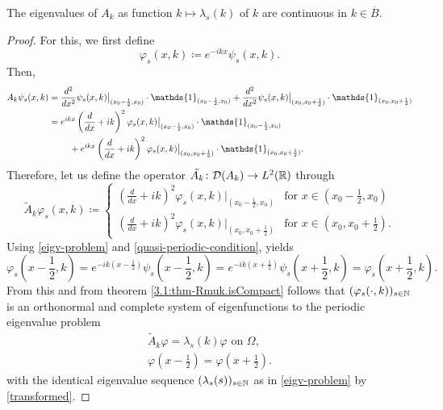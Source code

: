 \begin{theorem}
	The eigenvalues of $A_{k}$ as function $k \mapsto \lambda_{s}(k)$ of $k$ are continuous in $k \in \overline{B}$.

	\begin{proof}
		For this, we first define
			\[ \varphi_{s}(x, k) \coloneqq e^{-ikx} \psi_{s}(x, k). \]
		Then,
		\begin{align}
			A_{k} \psi_{s}(x, k) & = \frac{d^{2}}{dx^{2}} \psi_{s}(x, k)\big|_{(x_{0} - \frac{1}{2}, x_{0})} \cdot \mathds{1}_{(x_{0} - \frac{1}{2}, x_{0})} + \frac{d^{2}}{dx^{2}} \psi_{s}(x, k)\big|_{(x_{0}, x_{0}  + \frac{1}{2})} \cdot \mathds{1}_{(x_{0}, x_{0} + \frac{1}{2})} \notag \\
				& = e^{ikx} \left( \frac{d}{dx} + ik \right)^{2} \varphi_{s}(x, k)\big|_{(x_{0} - \frac{1}{2}, x_{0})} \cdot \mathds{1}_{(x_{0} - \frac{1}{2}, x_{0})} \notag \\
				& ~\qquad + e^{ikx} \left( \frac{d}{dx} + ik \right)^{2} \varphi_{s}(x, k)\big|_{(x_{0}, x_{0}  + \frac{1}{2})} \cdot \mathds{1}_{(x_{0}, x_{0} + \frac{1}{2})}. \label{transformed}
		\end{align}
		Therefore, let us define the operator $\tilde{A_{k}} \colon \mathcal{D}(A_{k}) \rightarrow L^{2}(\mathbb{R})$ through 
			\[ \tilde{A}_{k} \varphi_{s}(x, k) \coloneqq \begin{cases}
 				\left( \frac{d}{dx} + ik \right)^{2} \varphi_{s}(x, k)|_{(x_{0} - \frac{1}{2}, x_{0})} & \text{for } x \in (x_{0} - \frac{1}{2}, x_{0}) \\ \left( \frac{d}{dx} + ik \right)^{2} \varphi_{s}(x, k)|_{(x_{0}, x_{0}  + \frac{1}{2})} & \text{for } x \in (x_{0}, x_{0} + \frac{1}{2}).
 			\end{cases} \] 
		Using \eqref{eigv-problem} and \eqref{quasi-periodic-condition}, yields
			\[ \varphi_{s}\left(x - \frac{1}{2}, k\right) = e^{-ik(x - \frac{1}{2})} \psi_{s}\left(x - \frac{1}{2}, k\right) = e^{-ik(x + \frac{1}{2})} \psi_{s}\left(x + \frac{1}{2}, k\right) = \varphi_{s}\left(x + \frac{1}{2}, k\right). \]
		From this and from theorem \ref{3.1:thm-Rmuk.isCompact} follows that $(\varphi_{s}(\cdot, k))_{s \in \mathbb{N}}$ is an orthonormal and complete system of eigenfunctions to the periodic eigenvalue problem
		\begin{align}
			\tilde{A}_{k} \varphi = \lambda_{s}(k) \varphi \text{ on } \Omega, \label{mod-eigv-problem} \\
		 	\varphi\left(x - \frac{1}{2}\right) = \varphi\left(x + \frac{1}{2}\right). \label{periodic-condition}
		\end{align}
		with the identical eigenvalue sequence $(\lambda_{s}(s))_{s \in \mathbb{N}}$ as in \eqref{eigv-problem} by \eqref{transformed}.
	\end{proof}
\end{theorem}